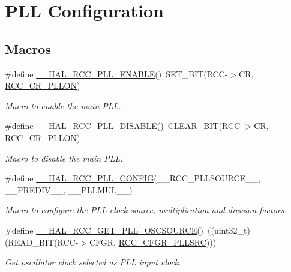 \hypertarget{group___r_c_c___p_l_l___configuration}{}\section{P\+LL Configuration}
\label{group___r_c_c___p_l_l___configuration}
\subsection*{Macros}
\begin{DoxyCompactItemize}
\item 
\#define \hyperlink{group___r_c_c___p_l_l___configuration_gaaf196a2df41b0bcbc32745c2b218e696}{\+\_\+\+\_\+\+H\+A\+L\+\_\+\+R\+C\+C\+\_\+\+P\+L\+L\+\_\+\+E\+N\+A\+B\+LE}()~S\+E\+T\+\_\+\+B\+IT(R\+CC-\/$>$CR, \hyperlink{group___peripheral___registers___bits___definition_gad0e73d5b0a4883e074d40029b49ee47e}{R\+C\+C\+\_\+\+C\+R\+\_\+\+P\+L\+L\+ON})
\begin{DoxyCompactList}\small\item\em Macro to enable the main P\+LL. \end{DoxyCompactList}\item 
\#define \hyperlink{group___r_c_c___p_l_l___configuration_ga718a6afcb1492cc2796be78445a7d5ab}{\+\_\+\+\_\+\+H\+A\+L\+\_\+\+R\+C\+C\+\_\+\+P\+L\+L\+\_\+\+D\+I\+S\+A\+B\+LE}()~C\+L\+E\+A\+R\+\_\+\+B\+IT(R\+CC-\/$>$CR, \hyperlink{group___peripheral___registers___bits___definition_gad0e73d5b0a4883e074d40029b49ee47e}{R\+C\+C\+\_\+\+C\+R\+\_\+\+P\+L\+L\+ON})
\begin{DoxyCompactList}\small\item\em Macro to disable the main P\+LL. \end{DoxyCompactList}\item 
\#define \hyperlink{group___r_c_c___p_l_l___configuration_gada29b788cc3bffb6438d6beef9c2b6f5}{\+\_\+\+\_\+\+H\+A\+L\+\_\+\+R\+C\+C\+\_\+\+P\+L\+L\+\_\+\+C\+O\+N\+F\+IG}(\+\_\+\+\_\+\+R\+C\+C\+\_\+\+P\+L\+L\+S\+O\+U\+R\+C\+E\+\_\+\+\_\+,  \+\_\+\+\_\+\+P\+R\+E\+D\+I\+V\+\_\+\+\_\+,  \+\_\+\+\_\+\+P\+L\+L\+M\+U\+L\+\_\+\+\_\+)
\begin{DoxyCompactList}\small\item\em Macro to configure the P\+LL clock source, multiplication and division factors. \end{DoxyCompactList}\item 
\#define \hyperlink{group___r_c_c___p_l_l___configuration_ga3ea1390f8124e2b3b8d53e95541d6e53}{\+\_\+\+\_\+\+H\+A\+L\+\_\+\+R\+C\+C\+\_\+\+G\+E\+T\+\_\+\+P\+L\+L\+\_\+\+O\+S\+C\+S\+O\+U\+R\+CE}()~((uint32\+\_\+t)(R\+E\+A\+D\+\_\+\+B\+IT(R\+CC-\/$>$C\+F\+GR, \hyperlink{group___peripheral___registers___bits___definition_gaba4a5dbbd286f07a97f5aa6e6f3f6a57}{R\+C\+C\+\_\+\+C\+F\+G\+R\+\_\+\+P\+L\+L\+S\+RC})))
\begin{DoxyCompactList}\small\item\em Get oscillator clock selected as P\+LL input clock. \end{DoxyCompactList}\end{DoxyCompactItemize}


